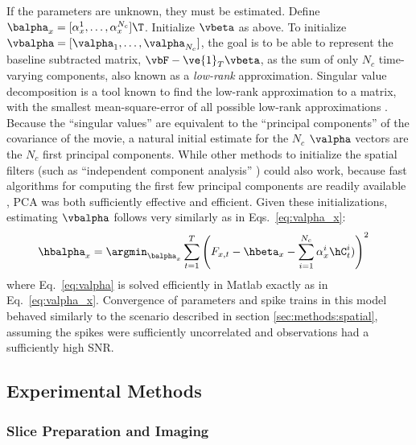 If the parameters are unknown, they must be estimated. Define $\balpha_x=[\alpha_x^1, \ldots, \alpha_x^{N_c}]\T$.  Initialize $\vbeta$ as above. To initialize $\vbalpha=[\valpha_1, \ldots, \valpha_{N_c}]$, the goal is to be able to represent the baseline subtracted matrix, $\vbF - \ve{1}_T \vbeta$, as the sum of only $N_c$ time-varying components, also known as a \emph{low-rank} approximation.  Singular value decomposition is a tool known to find the low-rank approximation to a matrix, with the smallest mean-square-error of all possible low-rank approximations \cite{HornJohnson90}.  Because the ``singular values'' are equivalent to the ``principal components'' of the covariance of the movie, a natural initial estimate for the $N_c$ $\valpha$ vectors are the $N_c$ first principal components.  While other methods to initialize the spatial filters (such as ``independent component analysis'' \cite{MukamelSchnitzer09}) could also work, because fast algorithms for computing the first few principal components are readily available \cite{RokhlinTygert09}, PCA was both sufficiently effective and efficient.  Given these initializations, estimating $\vbalpha$ follows very similarly as in Eqs.~\eqref{eq:valpha_x}:
\begin{align} \label{eq:valpha}
	\hbalpha_x &= \argmin_{\balpha_x} \sum_{t=1}^T  \left(F_{x,t} -\hbeta_x - \sum_{i=1}^{N_c} \alpha_x^i  \hC_t^i )\right)^2 %
\end{align}
where Eq.~\eqref{eq:valpha} is solved efficiently in Matlab exactly as in Eq.~\eqref{eq:valpha_x}.  Convergence of parameters and spike trains in this model behaved similarly to the scenario described in section \ref{sec:methods:spatial}, assuming the spikes were sufficiently uncorrelated and observations had a sufficiently high SNR.





\subsection{Experimental Methods} \label{sec:exp}

\subsubsection{Slice Preparation and Imaging} 

